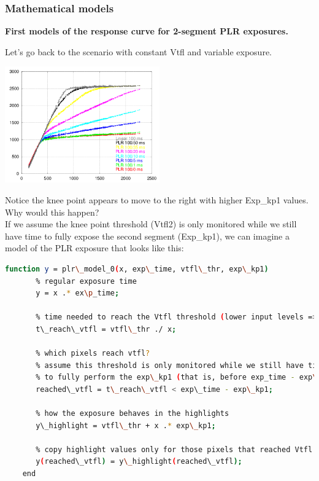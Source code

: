 \subsubsection{Mathematical models}

\textbf{First models of the response curve for 2-segment PLR exposures.}

Let's go back to the scenario with constant Vtfl and variable exposure. 

\begin{center}
\includegraphics[height=5cm]{images/100-x-32-plr-vs-30ms-lin}
\end{center}

Notice the knee point appears to move to the right with higher Exp_kp1 values. Why would this happen?\\

If we assume the knee point threshold (Vtfl2) is only monitored while we still have time to fully expose the second segment (Exp_kp1), we can imagine a model of the PLR exposure that looks like this:\\

\begin{lstlisting}[language=bash,morekeywords=$,keywordstyle=\bfseries,frame=none,xleftmargin=.25in,belowskip=2em, aboveskip=2em]
    function y = plr\_model_0(x, exp\_time, vtfl\_thr, exp\_kp1)
       % regular exposure time
       y = x .* ex\p_time;
       
       % time needed to reach the Vtfl threshold (lower input levels => longer times)
       t\_reach\_vtfl = vtfl\_thr ./ x;
       
       % which pixels reach vtfl?
       % assume this threshold is only monitored while we still have time
       % to fully perform the exp\_kp1 (that is, before exp_time - exp\_kp1)
       reached\_vtfl = t\_reach\_vtfl < exp\_time - exp\_kp1;
       
       % how the exposure behaves in the highlights
       y\_highlight = vtfl\_thr + x .* exp\_kp1;
       
       % copy highlight values only for those pixels that reached Vtfl
       y(reached\_vtfl) = y\_highlight(reached\_vtfl);
    end
\end{lstlisting}

